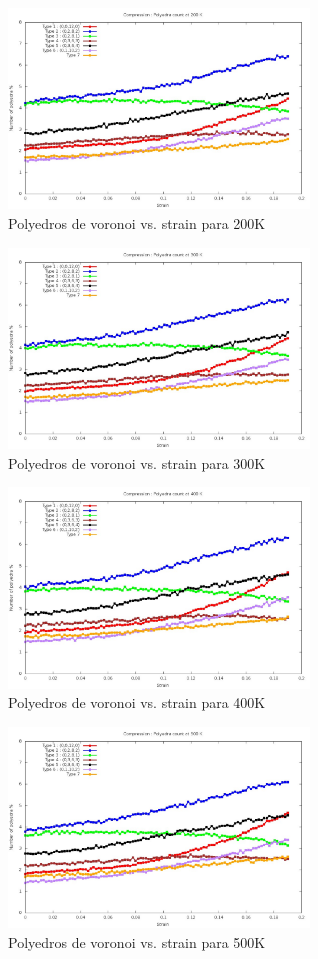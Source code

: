\documentclass[10pt, oneside]{article} %
\begin{document}
\begin{figure}[H]
\centering
\includegraphics[width=8cm]{Figures/Compr_Polyedra_200K.jpeg}
\caption{Polyedros de voronoi vs. strain para 200K}
\end{figure}

\begin{figure}[H]
\centering
\includegraphics[width=8cm]{Figures/Compr_Polyedra_300K.jpeg}
\caption{Polyedros de voronoi vs. strain para 300K}
\end{figure}

\begin{figure}[H]
\centering
\includegraphics[width=8cm]{Figures/Compr_Polyedra_400K.jpeg}
\caption{Polyedros de voronoi vs. strain para 400K}
\end{figure}

\begin{figure}[H]
\centering
\includegraphics[width=8cm]{Figures/Compr_Polyedra_500K.jpeg}
\caption{Polyedros de voronoi vs. strain para 500K}
\end{figure}
\end{document}
